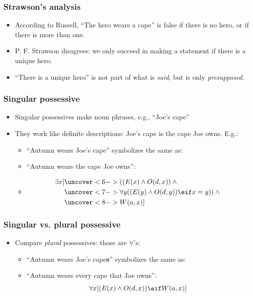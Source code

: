 \begin{frame}
    \frametitle{Strawson's analysis}

\begin{itemize}
\item According to Russell, ``The hero wears a cape'' is false if there is no hero, or if there is more than one.
\item P. F. Strawson disagrees: we only succeed in making a statement
if there is a unique hero.
\item ``There is a unique hero'' is not part of what is \emph{said}, but is only \emph{presupposed}.
\end{itemize}
\end{frame}

\begin{frame}
  \frametitle{Singular possessive}

  \begin{itemize}[<+->]
    \item Singular possessives make noun phrases, e.g., ``Joe's cape''
    \item They work like definite descriptions: Joe's cape is the cape Joe owns.
    E.g.:
    \begin{itemize}
      \item ``Autumn wears \alert{Joe's cape}'' symbolizes the same as:
      \item[] ``Autumn wears \alert{the cape Joe owns}'':
      \item[]
      \begin{align*}
        \exists x[& \uncover<6->{((E(x) \land O(d,x)) \land {}}\\
        & \uncover<7->{\forall y((E(y) \land O(d,y)) \eif x=y)) \land {}}\\
        & \uncover<8->{W(a,x)]}
      \end{align*}
    \end{itemize}
  \end{itemize}
\end{frame}

\begin{frame}
  \frametitle{Singular vs. plural possessive}

  \begin{itemize}[<+->]
    \item Compare \emph{plural} possessives: those are $\forall$'s:
    \begin{itemize}[<+->]
      \item ``Autumn wears \alert{Joe's cape\textbf{s}}'' symbolizes the same
      as:
      \item[] ``Autumn wears every cape that Joe owns'':
      \[\forall x[(E(x) \land O(d,x)) \eif W(a,x)]\]
    \end{itemize}
  \end{itemize}
\end{frame}

